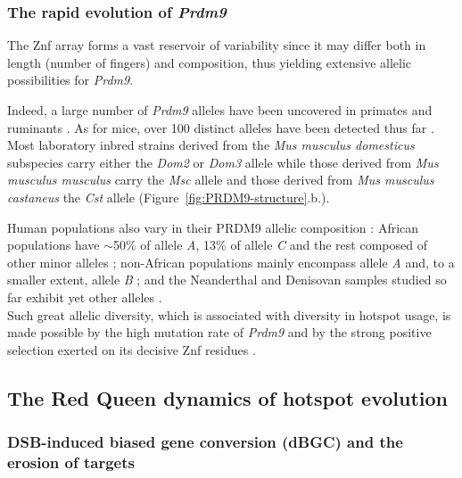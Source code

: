 \subsubsection{The rapid evolution of \textit{Prdm9}}

The Znf array forms a vast reservoir of variability since it may differ both in length (number of fingers) and composition, thus yielding extensive allelic possibilities for \textit{Prdm9}.

Indeed, a large number of \textit{Prdm9} alleles have been uncovered in primates \citep{groeneveld2012high,heerschop2016pioneering} and ruminants \citep{ahlawat2016zinc}.
As for mice, over 100 distinct alleles have been detected thus far \citep{buard2014diversity, kono2014prdm9}.
Most laboratory inbred strains derived from the \textit{Mus musculus domesticus} subspecies carry either the \textit{Dom2} or \textit{Dom3} allele while those derived from \textit{Mus musculus musculus} carry the \textit{Msc} allele and those derived from \textit{Mus musculus castaneus} the \textit{Cst} allele (Figure~\ref{fig:PRDM9-structure}.b.).

Human populations also vary in their PRDM9 allelic composition \citep{berg2010prdm9, berg2011variants, fledel-alon2011variation}: African populations have $\sim$50\% of allele \textit{A}, 13\% of allele \textit{C} and the rest composed of other minor alleles \citep{berg2011variants}; non-African populations mainly encompass allele \textit{A} and, to a smaller extent, allele \textit{B} \citep{baudat2010prdm9,berg2010prdm9,hinch2011landscape}; and the Neanderthal and Denisovan samples studied so far exhibit yet other alleles \citep{schwartz2014primate,lesecque2014red}.\\

Such great allelic diversity, which is associated with diversity in hotspot usage, is made possible by the high mutation rate of \textit{Prdm9} \citep{jeffreys2013recombination} and by the strong positive selection exerted on its decisive Znf residues \citep{oliver2009accelerated,thomas2009extraordinary,ponting2011what}.




\subsection{The Red Queen dynamics of hotspot evolution}

\subsubsection{DSB-induced biased gene conversion (dBGC) and the erosion of targets}

